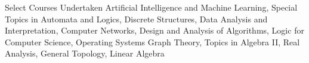 \begin{rubric}{Select Courses Undertaken}
		Artificial Intelligence and Machine Learning, Special Topics in Automata and Logics, Discrete Structures, Data Analysis and Interpretation, Computer Networks, Design and Analysis of Algorithms, Logic for Computer Science, Operating Systems
	\entry*[Mathematics]
		Graph Theory, Topics in Algebra II, Real Analysis, General Topology, Linear Algebra
\end{rubric}